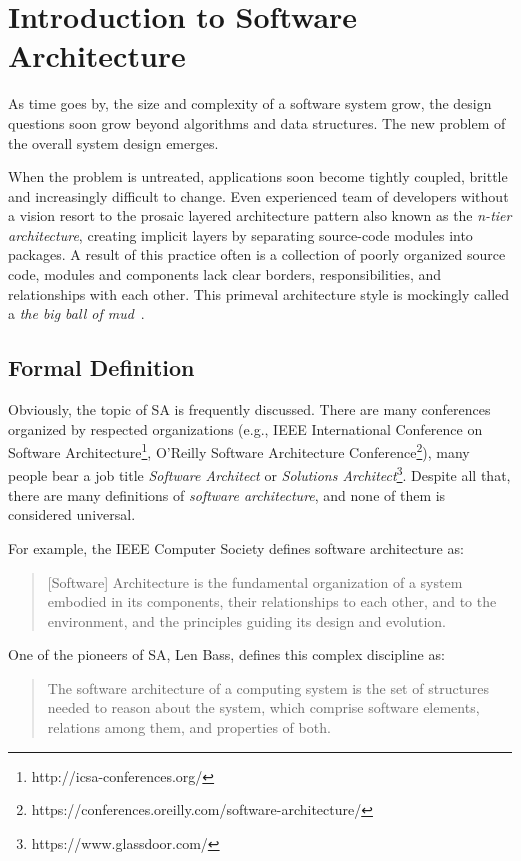 \documentclass[thesis=M,english,hidelinks]{FITthesis}[2012/10/20]
\begin{document}
% 
% 
\section{Introduction to Software Architecture}
As time goes by, the size and complexity of a software system grow, the design questions soon grow beyond algorithms and data structures. The new problem of the overall system design emerges.

When the problem is untreated, applications soon become tightly coupled, brittle and increasingly difficult to change. Even experienced team of developers without a vision resort to the prosaic layered architecture pattern also known as the \textit{n-tier architecture}, creating implicit layers by separating source-code modules into packages. A result of this practice often is a collection of poorly organized source code, modules and components lack clear borders, responsibilities, and relationships with each other. This primeval architecture style is mockingly called a \textit{the big ball of mud}~\cite{big-ball-mud}.

\subsection{Formal Definition}
Obviously, the topic of \acrfull{SA} is frequently discussed. There are many conferences organized by respected organizations (e.g., IEEE International Conference on Software Architecture\footnote{http://icsa-conferences.org/}, O'Reilly Software Architecture Conference\footnote{https://conferences.oreilly.com/software-architecture/}), many people bear a job title \textit{Software Architect} or \textit{Solutions Architect}\footnote{https://www.glassdoor.com/}. Despite all that, there are many definitions of \textit{software architecture}, and none of them is considered universal.

For example, the IEEE Computer Society defines software architecture as:
\begin{quote}
    [Software] Architecture is the fundamental organization of a system embodied in its components, their relationships to each other, and to the environment, and the principles guiding its design and evolution.~\cite{std-ieee-arch}
\end{quote}

One of the pioneers of \acrlong{SA}, Len Bass, defines this complex discipline as:
\begin{quote}
    The software architecture of a computing system is the set of structures needed to reason about the system, which comprise software elements, relations among them, and properties of both.~\cite{documenting-sw-arch}
\end{quote}
\end{document}
